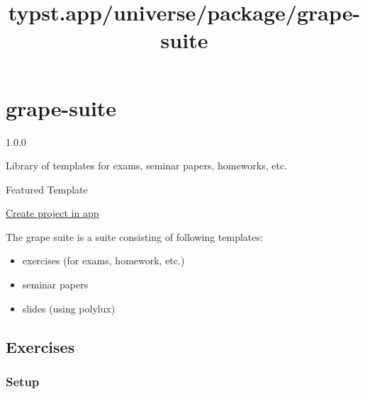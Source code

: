 \title{typst.app/universe/package/grape-suite}

\label{banner}
\label{template-thumbnail}

\section{grape-suite}\label{grape-suite}

{ 1.0.0 }

Library of templates for exams, seminar papers, homeworks, etc.

{ } Featured Template

\href{/app?template=grape-suite&version=1.0.0}{Create project in app}

\label{readme}
The grape suite is a suite consisting of following templates:

\begin{itemize}
\item
  exercises (for exams, homework, etc.)
\item
  seminar papers
\item
  slides (using polylux)
\end{itemize}

\subsection{Exercises}\label{exercises}

\subsubsection{Setup}\label{setup}

\begin{Shaded}
\begin{Highlighting}[]





\NormalTok{)}
\end{Highlighting}
\end{Shaded}

